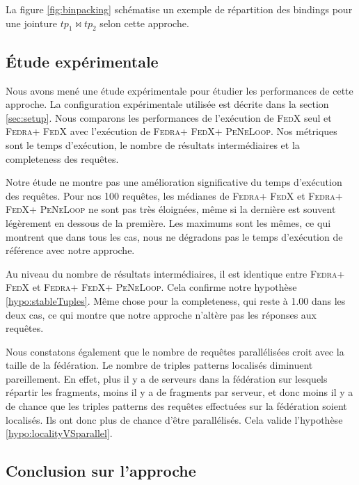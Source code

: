 \documentclass[a4paper]{article}
\def\fedra{\textsc{Fedra}\xspace}
\def\fedx{\textsc{FedX}\xspace}
\def\peneloop{\textsc{PeNeLoop}\xspace}
\begin{document}
La figure \ref{fig:binpacking} schématise un exemple de répartition des bindings pour une jointure $tp_1 \bowtie tp_2$ selon cette approche.





\subsection{Étude expérimentale}\label{sec:expPBJ}

Nous avons mené une étude expérimentale pour étudier les performances de cette approche. La configuration expérimentale utilisée est décrite dans la section \ref{sec:setup}. Nous comparons les performances de l'exécution de \fedx seul et \fedra + \fedx avec l'exécution de \fedra + \fedx + \peneloop. Nos métriques sont le temps d'exécution, le nombre de résultats intermédiaires et la completeness des requêtes.

Notre étude ne montre pas une amélioration significative du temps d'exécution des requêtes. Pour nos 100 requêtes, les médianes de \fedra + \fedx et \fedra + \fedx + \peneloop ne sont pas très éloignées, même si la dernière est souvent légèrement en dessous de la première. Les maximums sont les mêmes, ce qui montrent que dans tous les cas, nous ne dégradons pas le temps d'exécution de référence avec notre approche.

Au niveau du nombre de résultats intermédiaires, il est identique entre \fedra + \fedx et \fedra + \fedx + \peneloop. Cela confirme notre hypothèse \ref{hypo:stableTuples}. Même chose pour la completeness, qui reste à 1.00 dans les deux cas, ce qui montre que notre approche n'altère pas les réponses aux requêtes.

Nous constatons également que le nombre de requêtes parallélisées croit avec la taille de la fédération. Le nombre de triples patterns localisés diminuent pareillement. En effet, plus il y a de serveurs dans la fédération sur lesquels répartir les fragments, moins il y a de fragments par serveur, et donc moins il y a de chance que les triples patterns des requêtes effectuées sur la fédération soient localisés. Ils ont donc plus de chance d'être parallélisés. Cela valide l'hypothèse \ref{hypo:localityVSparallel}.

\subsection{Conclusion sur l'approche}
\end{document}
